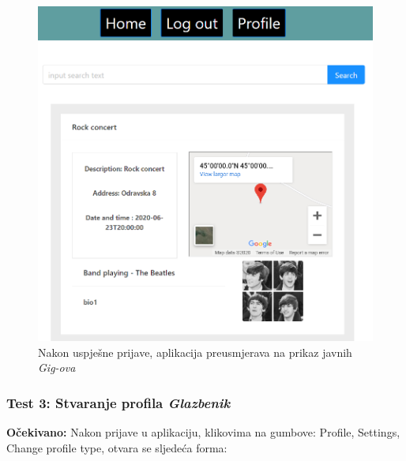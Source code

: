 			\begin{figure}[H]
				\begin{center}
					\includegraphics[width=15cm]{slike/login_redirect.PNG}
				\end{center}
				\caption{Nakon uspješne prijave, aplikacija preusmjerava na prikaz javnih \textit{Gig-ova}}
				\label{fig:inttest}
			\end{figure}
		
		\subsubsection{Test 3: Stvaranje profila \textit{Glazbenik}}
		\textbf{Očekivano:} Nakon prijave u aplikaciju, klikovima na gumbove: Profile, Settings, Change profile type, otvara se sljedeća forma:
		
